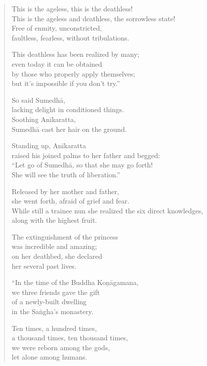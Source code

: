 \documentclass[12pt,openany]{book}%
\begin{document}
\begin{verse}
This is the ageless, this is the deathless! \\
This is the ageless and deathless, the sorrowless state! \\
Free of enmity, unconstricted, \\
faultless, fearless, without tribulations. 

This deathless has been realized by many; \\
even today it can be obtained \\
by those who properly apply themselves; \\
but it’s impossible if you don’t try.” 

So said \textsanskrit{Sumedhā}, \\
lacking delight in conditioned things. \\
Soothing \textsanskrit{Anīkaratta}, \\
\textsanskrit{Sumedhā} cast her hair on the ground. 

Standing up, \textsanskrit{Anīkaratta} \\
raised his joined palms to her father and begged: \\
“Let go of \textsanskrit{Sumedhā}, so that she may go forth! \\
She will see the truth of liberation.” 

Released by her mother and father, \\
she went forth, afraid of grief and fear. \\
While still a trainee nun she realized the six direct knowledges, \\
along with the highest fruit. 

The extinguishment of the princess \\
was incredible and amazing; \\
on her deathbed, she declared \\
her several past lives. 

“In the time of the Buddha \textsanskrit{Koṇāgamana}, \\
we three friends gave the gift \\
of a newly-built dwelling \\
in the \textsanskrit{Saṅgha}’s monastery. 

Ten times, a hundred times, \\
a thousand times, ten thousand times, \\
we were reborn among the gods, \\
let alone among humans. 


\end{verse}
\end{document}

